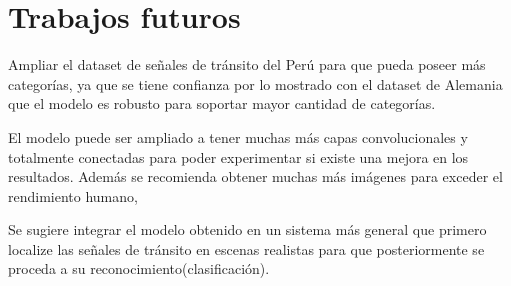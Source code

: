 \section{Trabajos futuros}

	Ampliar el dataset de señales de tránsito del Perú para que pueda poseer más categorías, ya que se tiene confianza por lo mostrado con el dataset de Alemania que el modelo es robusto para soportar mayor cantidad de categorías.

	El modelo puede ser ampliado a tener muchas más capas convolucionales y totalmente conectadas para poder experimentar si existe una mejora en los resultados. Además se recomienda obtener muchas más imágenes para exceder el rendimiento humano, \citep{Goodfellow-et-al-2016}
	
	Se sugiere integrar el modelo obtenido en un sistema más general que primero localize las señales de tránsito en escenas realistas para que posteriormente se proceda a su reconocimiento(clasificación).